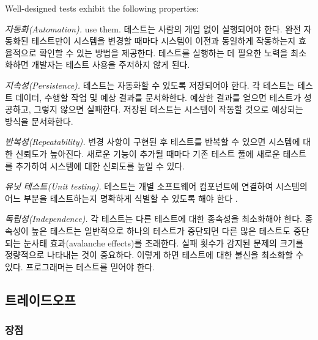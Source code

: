 \documentclass[a4paper,10pt,twoside]{book}
\begin{document}
Well-designed tests exhibit the following properties:

\begin{bulletlist}
\item \emph{자동화(Automation).} use them.
테스트는 사람의 개입 없이 실행되어야 한다. 완전 자동화된 테스트만이 시스템을 변경할 때마다 시스템이 이전과 동일하게 작동하는지 효율적으로 확인할 수 있는 방법을 제공한다. 테스트를 실행하는 데 필요한 노력을 최소화하면 개발자는 테스트 사용을 주저하지 않게 된다.

\item \emph{지속성(Persistence).}
테스트는 자동화할 수 있도록 저장되어야 한다. 각 테스트는 테스트 데이터, 수행할 작업 및 예상 결과를 문서화한다. 예상한 결과를 얻으면 테스트가 성공하고, 그렇지 않으면 실패한다. 저장된 테스트는 시스템이 작동할 것으로 예상되는 방식을 문서화한다.

\item \emph{반복성(Repeatability).}
변경 사항이 구현된 후 테스트를 반복할 수 있으면 시스템에 대한 신뢰도가 높아진다. 새로운 기능이 추가될 때마다 기존 테스트 풀에 새로운 테스트를 추가하여 시스템에 대한 신뢰도를 높일 수 있다.

\item \emph{유닛 테스트(Unit testing).}
테스트는 개별 소프트웨어 컴포넌트에 연결하여 시스템의 어느 부분을 테스트하는지 명확하게 식별할 수 있도록 해야 한다 \cite{Davi95a}.

\item \emph{독립성(Independence).}
각 테스트는 다른 테스트에 대한 종속성을 최소화해야 한다. 종속성이 높은 테스트는 일반적으로 하나의 테스트가 중단되면 다른 많은 테스트도 중단되는 눈사태 효과(avalanche effects)를 초래한다. 실패 횟수가 감지된 문제의 크기를 정량적으로 나타내는 것이 중요하다. 이렇게 하면 테스트에 대한 불신을 최소화할 수 있다. 프로그래머는 테스트를 믿어야 한다.
\end{bulletlist}

\subsection*{트레이드오프}

\subsubsection*{장점}
\end{document}
